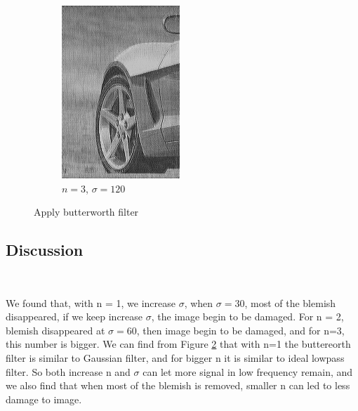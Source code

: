 \documentclass[
	12pt, %
]{style/fphw}
\begin{document}
\begin{figure}[H]
\begin{subfigure}[b]{.22\textwidth}
             \includegraphics[width=\textwidth]{Q5_3_2_120.png}
             \caption{$n=3$, $\sigma=120$}
             \label{Q5_3_3_120.tif}
         \end{subfigure}
     \caption{Apply butterworth filter}
     \label{Butterworth filter}
\end{figure}

\subsection*{Discussion} \

We found that, with n = 1, we increase $\sigma$, when $\sigma=30$, most of the blemish disappeared, if we keep increase $\sigma$, the image begin to be damaged. For n = 2, blemish disappeared at $\sigma=60$, then image begin to be damaged, and for n=3, this number is bigger. We can find from Figure \ref{Butterworth filter} that with n=1 the buttereorth filter is similar to Gaussian filter, and for bigger n it is similar to ideal lowpass filter. So both increase n and $\sigma$ can let more signal in low frequency remain, and we also find that when most of the blemish is removed, smaller n can led to less damage to image.
\end{document}
